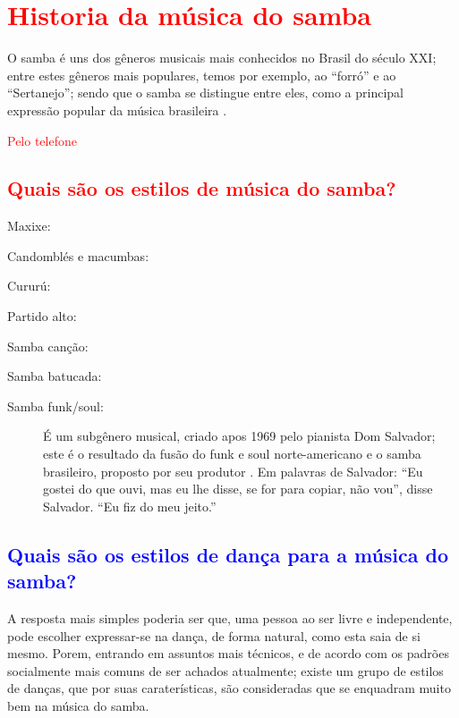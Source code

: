 
\chapter{\textcolor{red}{Historia da música do samba}}

O samba é uns dos gêneros musicais mais conhecidos no Brasil do século XXI;
entre estes gêneros mais populares, temos por exemplo, ao ``forró'' e ao ``Sertanejo'';
sendo que o samba se distingue entre eles, 
como a principal expressão popular da música brasileira \cite[pp. 47]{diniz2008almanaque}. 

\textcolor{red}{Pelo telefone\cite{musicapelotelefone}}

\section{\textcolor{red}{Quais são os estilos de música do samba?}}

\begin{description}
\item[Maxixe:] \cite[pp. 9]{musicasambavariasdef1} 
\item[Candomblés e macumbas:] \cite[pp. 9]{musicasambavariasdef1} 
\item[Cururú:] \cite[pp. 9]{musicasambavariasdef1} 
\item[Partido alto:] \cite[pp. 9]{musicasambavariasdef1} 
\item[Samba canção:] \cite[pp. 9]{musicasambavariasdef1} 
\item[Samba batucada:] \cite[pp. 9]{musicasambavariasdef1} 
\item[Samba funk/soul:] É um subgênero musical, criado apos 1969 pelo pianista Dom Salvador; 
este é o resultado da fusão do funk e soul norte-americano e o samba brasileiro, proposto por seu produtor \cite{sambafunkmusica}.
Em palavras de Salvador: ``Eu gostei do que ouvi, mas eu lhe disse, se for para copiar, não vou'', 
disse Salvador. ``Eu fiz do meu jeito.''
\end{description}

\section{\textcolor{blue}{Quais são os estilos de dança para a música do samba?}}
\label{subsec:estilosdedanca}
A resposta mais simples poderia ser que, uma pessoa ao ser livre e independente,
pode escolher expressar-se na dança, de forma natural, como esta saia de si mesmo.
Porem, entrando em assuntos mais técnicos, 
e de acordo com os padrões socialmente mais comuns de ser achados atualmente;
existe um grupo de estilos de danças, que por suas caraterísticas, 
são consideradas que se enquadram muito bem na música do samba.

